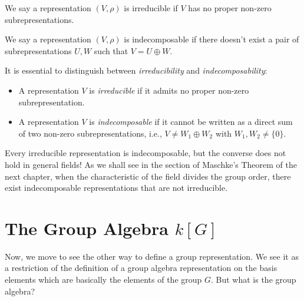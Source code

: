 \begin{definition}
    We say a representation $(V, \rho)$ is irreducible if $V$ has no proper non-zero subrepresentations.
\end{definition}
\begin{definition}
    We say a representation $(V, \rho)$ is indecomposable if there doesn't exist a pair of subrepresentations $U,W$ such that $V = U \oplus W$.
\end{definition}
\begin{note}

It is essential to distinguish between \emph{irreducibility} and \emph{indecomposability}:

\begin{itemize}

    \item A representation $V$ is \emph{irreducible} if it admits no proper non-zero subrepresentation.

    \item A representation $V$ is \emph{indecomposable} if it cannot be written as a direct sum of two non-zero subrepresentations, i.e., $V \neq W_1 \oplus W_2$ with $W_1, W_2 \neq \{0\}$.

\end{itemize}

Every irreducible representation is indecomposable, but the converse does not hold in general fields! As we shall see in the section of Maschke's Theorem of the next chapter, when the characteristic of the field divides the group order, there exist indecomposable representations that are not irreducible.

\end{note}



\section{The Group Algebra $k[G]$}
Now, we move to see the other way to define a group representation. We see it as a restriction of the definition of a group algebra representation on the basis elements which are basically the elements of the group $G$. But what is the group algebra?


